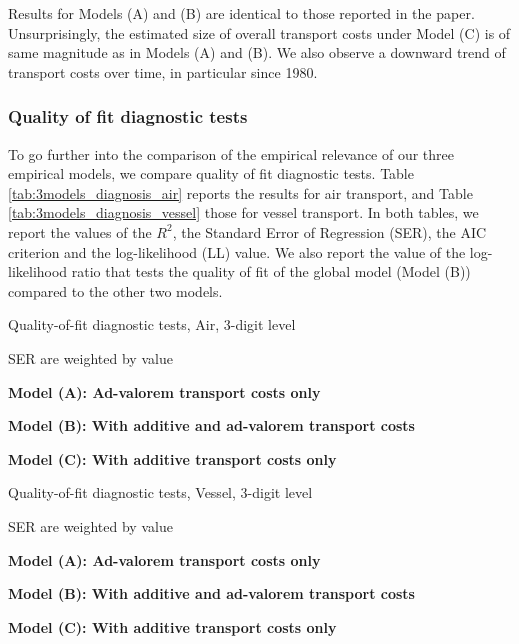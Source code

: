 \documentclass[11pt,twoside, authoryear]{elsarticle}
\begin{document}
Results for Models (A) and (B) are identical to those reported in the paper. Unsurprisingly, the estimated size of overall transport costs under Model (C) is of same magnitude as in Models (A) and (B). We also observe a downward trend of transport costs over time, in particular since 1980.\\



\subsubsection{Quality of fit diagnostic tests}

To go further into the comparison of the empirical relevance of our three empirical models, we compare quality of fit diagnostic tests. Table \ref{tab:3models_diagnosis_air} reports the results for air transport, and Table \ref{tab:3models_diagnosis_vessel} those for vessel transport. In both tables, we report the values of the $R^2$, the Standard Error of Regression (SER), the AIC criterion  and the log-likelihood (LL) value. We also report the value of the log-likelihood ratio that tests the quality of fit of the global model (Model (B)) compared to the other two models.

\begin{table}[htbp]
\centering
\footnotesize{
	\caption{Quality-of-fit diagnostic tests, Air, 3-digit level}
	\label{tab:3models_diagnosis_air}%
	
\begin{tablenotes}
	\tiny
	\item SER are weighted by value
	\item \textbf{Model (A): Ad-valorem transport costs only}
	\item \textbf{Model (B): With additive and ad-valorem transport costs}
	\item \textbf{Model (C): With additive transport costs only}
\end{tablenotes}
}
\end{table}%



\begin{table}[htbp]
	\centering
	\footnotesize{
		\caption{Quality-of-fit diagnostic tests, Vessel, 3-digit level}
		\label{tab:3models_diagnosis_vessel}%
		
		\begin{tablenotes}
			\tiny
			\item SER are weighted by value
			\item \textbf{Model (A): Ad-valorem transport costs only}
			\item \textbf{Model (B): With additive and ad-valorem transport costs}
			\item \textbf{Model (C): With additive transport costs only}
\end{tablenotes}
}
\end{table}%
\end{document}
